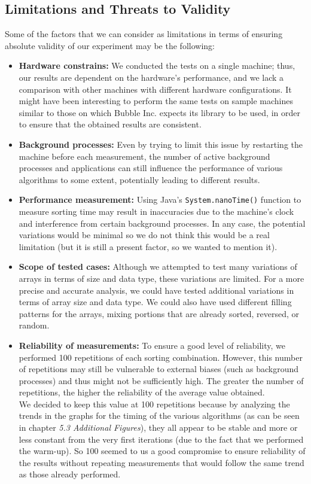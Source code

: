 \documentclass{article}
\begin{document}
    \subsection{Limitations and Threats to Validity}
    Some of the factors that we can consider as limitations in terms of ensuring absolute validity of our experiment may be the following:
    \begin{itemize}
        \item \textbf{Hardware constrains:} We conducted the tests on a single machine; thus, our results are dependent on the hardware's performance, and we lack a comparison with other machines with different hardware configurations. It might have been interesting to perform the same tests on sample machines similar to those on which Bubble Inc. expects its library to be used, in order to ensure that the obtained results are consistent.
        \item \textbf{Background processes:} Even by trying to limit this issue by restarting the machine before each measurement, the number of active background processes and applications can still influence the performance of various algorithms to some extent, potentially leading to different results.
        \item \textbf{Performance measurement:} Using Java's \texttt{System.nanoTime()} function to measure sorting time may result in inaccuracies due to the machine's clock and interference from certain background processes. In any case, the potential variations would be minimal so we do not think this would be a real limitation (but it is still a present factor, so we wanted to mention it).
        \item \textbf{Scope of tested cases:} Although we attempted to test many variations of arrays in terms of size and data type, these variations are limited. For a more precise and accurate analysis, we could have tested additional variations in terms of array size and data type. We could also have used different filling patterns for the arrays, mixing portions that are already sorted, reversed, or random.
        \item \textbf{Reliability of measurements:} To ensure a good level of reliability, we performed 100 repetitions of each sorting combination. However, this number of repetitions may still be vulnerable to external biases (such as background processes) and thus might not be sufficiently high. The greater the number of repetitions, the higher the reliability of the average value obtained. \\ We decided to keep this value at 100 repetitions because by analyzing the trends in the graphs for the timing of the various algorithms (as can be seen in chapter \textit{5.3 Additional Figures}), they all appear to be stable and more or less constant from the very first iterations (due to the fact that we performed the warm-up). So 100 seemed to us a good compromise to ensure reliability of the results without repeating measurements that would follow the same trend as those already performed.
    \end{itemize}
\end{document}
